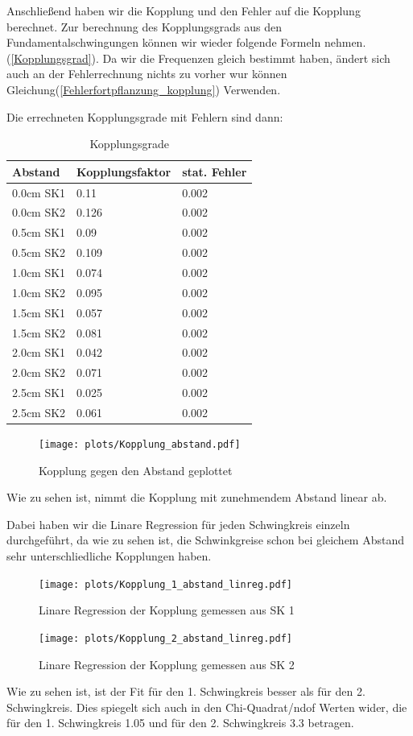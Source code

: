 \documentclass[twoside]{protokoll}
\begin{document}
Anschließend haben wir die Kopplung und den Fehler auf die Kopplung berechnet.
Zur berechnung des Kopplungsgrads aus den Fundamentalschwingungen können wir wieder folgende Formeln nehmen. (\ref{Kopplungsgrad}).
Da wir die Frequenzen gleich bestimmt haben, ändert sich auch an der Fehlerrechnung nichts zu vorher wur können Gleichung(\ref{Fehlerfortpflanzung_kopplung}) Verwenden.

Die errechneten Kopplungsgrade mit Fehlern sind dann:
\begin{table}[H]
        \centering
        \caption{Kopplungsgrade}
        \begin{tabularx}{0.7\textwidth}{X X X}
            \toprule
            \textbf{Abstand} & \textbf{Kopplungsfaktor} & \textbf{stat. Fehler} \\
            \midrule
0.0cm SK1 &  0.11  & 0.002 \\
0.0cm SK2 &  0.126  & 0.002 \\
0.5cm SK1 &  0.09  & 0.002 \\
0.5cm SK2 &  0.109  & 0.002 \\
1.0cm SK1 &  0.074  & 0.002 \\
1.0cm SK2 &  0.095  & 0.002 \\
1.5cm SK1 &  0.057  & 0.002 \\
1.5cm SK2 &  0.081  & 0.002 \\
2.0cm SK1 &  0.042  & 0.002 \\
2.0cm SK2 &  0.071  & 0.002 \\
2.5cm SK1 &  0.025  & 0.002 \\
2.5cm SK2 &  0.061  & 0.002 \\
            \bottomrule
        \end{tabularx}
        \label{tab:mytable}
\end{table}

\begin{figure}[H]
    \centering
    \texttt{[image: plots/Kopplung\_abstand.pdf]}
    \caption{Kopplung gegen den Abstand geplottet}
\end{figure}
Wie zu sehen ist, nimmt die Kopplung mit zunehmendem Abstand linear ab.

Dabei haben wir die Linare Regression für jeden Schwingkreis einzeln durchgeführt, da wie zu sehen ist, die Schwinkgreise schon bei gleichem Abstand sehr unterschliedliche Kopplungen haben.
 
\begin{figure}[H]
    \centering
    \texttt{[image: plots/Kopplung\_1\_abstand\_linreg.pdf]}
    \caption{Linare Regression der Kopplung gemessen aus SK 1}
\end{figure}
\begin{figure}[H]
    \centering
    \texttt{[image: plots/Kopplung\_2\_abstand\_linreg.pdf]}
    \caption{Linare Regression der Kopplung gemessen aus SK 2}
\end{figure}
Wie zu sehen ist, ist der Fit für den 1. Schwingkreis besser als für den 2. Schwingkreis.
Dies spiegelt sich auch in den Chi-Quadrat/ndof Werten wider, die für den 1. Schwingkreis 1.05 und für den 2. Schwingkreis 3.3 betragen.
 
\end{document}
